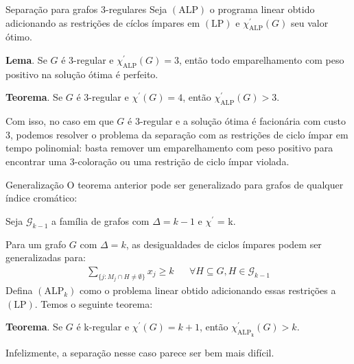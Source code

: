 \documentclass{beamer}
\begin{document}
    \begin{frame}{Separação para grafos 3-regulares}
        Seja {\color{blue} $(\mathrm{ALP})$} o programa linear obtido adicionando as restrições de cíclos ímpares em {\color{blue} $(\mathrm{LP})$} e {\color{blue} $\chi^\prime_\mathrm{ALP}(G)$} seu valor ótimo.

        \vspace{0.5cm}
        {\color{blue} \bf Lema}. Se {\color{blue} $G$} é 3-regular e {\color{blue} $\chi^\prime_\mathrm{ALP}(G) = 3$}, então todo emparelhamento com peso positivo na solução ótima é perfeito.

        \vspace{0.5cm}
        {\color{blue} \bf Teorema}. Se {\color{blue} $G$} é 3-regular e {\color{blue} $\chi^\prime(G) = 4$}, então {\color{blue} $\chi^\prime_\mathrm{ALP}(G) > 3$}.

        \pause
        \vspace{0.5cm}
        Com isso, no caso em que {\color{blue} $G$} é 3-regular e a solução ótima é facionária com custo 3, podemos resolver o problema da separação com as restrições de ciclo ímpar em tempo polinomial: basta remover um emparelhamento com peso positivo para encontrar uma 3-coloração ou uma restrição de ciclo ímpar violada.
    \end{frame}

    \begin{frame}{Generalização}
        O teorema anterior pode ser generalizado para grafos de qualquer índice cromático:

        \pause
        Seja {\color{blue} $\mathscr{G}_{k-1}$} a família de grafos com {\color{blue} $\Delta = k - 1$} e {\color{blue} $\chi^\prime$ = k}.
        
        \pause
        Para um grafo {\color{blue} $G$} com {\color{blue} $\Delta = k$}, as desigualdades de ciclos ímpares podem ser generalizadas para:
        {\color{blue}
        \begin{align*}
            \sum_{\{j \colon M_j \cap H \neq \emptyset\}} x_j \geq k
            &&\forall H \subseteq G, H \in \mathscr{G}_{k-1}
        \end{align*}
        }
        \pause
        Defina {\color{blue} $(\mathrm{ALP}_k)$} como o problema linear obtido adicionando essas restrições a {\color{blue} $(\mathrm{LP})$}. Temos o seguinte teorema:

        \vspace{0.5cm}
        {\color{blue} \bf Teorema}. Se {\color{blue} $G$} é k-regular e {\color{blue} $\chi^\prime(G) = k + 1$}, então {\color{blue} $\chi^\prime_\mathrm{ALP_k}(G) > k$}.

        \pause
        \vspace{0.5cm}
        Infelizmente, a separação nesse caso parece ser bem mais difícil.
    \end{frame}
\end{document}
